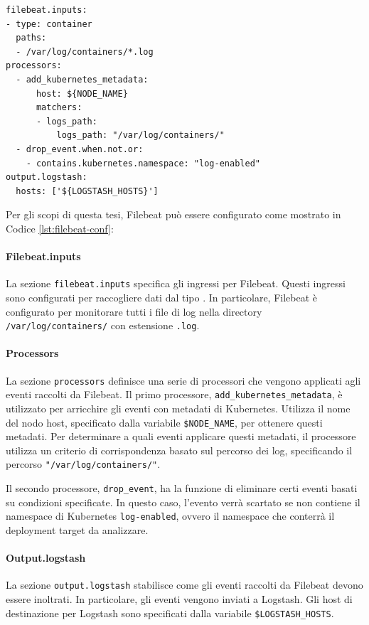 \begin{lstlisting}[caption={File di configurazione di Filebeat.},label=lst:filebeat-conf, keywordstyle=\color{black}, commentstyle=\color{black},stringstyle=\color{black},numberstyle=\color{black}]
filebeat.inputs:
- type: container
  paths:
  - /var/log/containers/*.log
processors:
  - add_kubernetes_metadata:
      host: ${NODE_NAME}
      matchers:
      - logs_path:
          logs_path: "/var/log/containers/"
  - drop_event.when.not.or:
    - contains.kubernetes.namespace: "log-enabled"
output.logstash:
  hosts: ['${LOGSTASH_HOSTS}']
\end{lstlisting}

Per gli scopi di questa tesi, Filebeat può essere configurato come mostrato in Codice \ref{lst:filebeat-conf}:
\paragraph{Filebeat.inputs}
La sezione \texttt{filebeat.inputs} specifica gli ingressi per Filebeat. Questi ingressi sono configurati per raccogliere dati dal tipo . In particolare, Filebeat è configurato per monitorare tutti i file di log nella directory \texttt{/var/log/containers/} con estensione \texttt{.log}.

\paragraph{Processors}
La sezione \texttt{processors} definisce una serie di processori che vengono applicati agli eventi raccolti da Filebeat. Il primo processore, \texttt{add\_kubernetes\_metadata}, è utilizzato per arricchire gli eventi con metadati di Kubernetes. Utilizza il nome del nodo host, specificato dalla variabile \texttt{\${NODE\_NAME}}, per ottenere questi metadati. Per determinare a quali eventi applicare questi metadati, il processore utilizza un criterio di corrispondenza basato sul percorso dei log, specificando il percorso \texttt{"/var/log/containers/"}.

Il secondo processore, \texttt{drop\_event}, ha la funzione di eliminare certi eventi basati su condizioni specificate. In questo caso, l'evento verrà scartato se non contiene il namespace di Kubernetes \texttt{log-enabled}, ovvero il namespace che conterrà il deployment target da analizzare.

\paragraph{Output.logstash}
La sezione \texttt{output.logstash} stabilisce come gli eventi raccolti da Filebeat devono essere inoltrati. In particolare, gli eventi vengono inviati a Logstash. Gli host di destinazione per Logstash sono specificati dalla variabile \texttt{\${LOGSTASH\_HOSTS}}.

